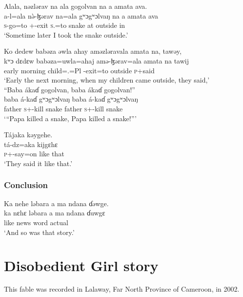 \ea  Alala,  nəzlərav  na ala  gogolvan  na   a  amata  ava. \\
\gll a-l=ala    n\`ə-ɮərav         na=ala  gʷɔgʷɔlvaŋ  na  a  amata  ava\\
\textsc{s}-go=to  {\oneS}+{\PFV}-exit  \textsc{s}.{\DO}=to  snake        {\PSP}    at   outside  in\\
\glt ‘Sometime later I took the snake outside.’ 
\z

\ea Ko  dedew  babəza  əwla  ahay  aməzləravala  amata  na, tawəy,\\
\gll kʷɔ     dɛdɛw     babəza=uwla=ahaj  amə-ɮərav=ala  amata      na    tawij\\
early   morning  child={\oneS}.{\POSS}=Pl  {\NOM}{}-exit=to     outside   {\PSP}    \textsc{p}+said\\
\glt ‘Early the next morning, when my children came outside, they said,’\\

\largerpage[2]
\medskip
 “Baba  ákaɗ  gogolvan,  baba   ákaɗ  gogolvan!”\\
\gll baba     á-kaɗ gʷɔgʷɔlvaŋ  baba   á-kaɗ gʷɔgʷɔlvaŋ\\
father   \textsc{s}+{\IFV}-kill      snake    father   \textsc{s}+{\IFV}-kill      snake\\
\glt  ‘“Papa killed a snake, Papa killed a snake!”’
\z

\ea Tájaka  kəygehe.\\
\gll tá-dz=aka   kijgɛhɛ\\
\textsc{p}+{\IFV}-say=on  {like that}\\
\glt ‘They said it like that.’
\z

\subsubsection*{Conclusion}
\ea Ka  nehe  ləbara  a  ma  ndana  ɗəwge.\\
\gll ka  nɛhɛ  ləbara  a       ma      ndana  ɗuwgɛ\\
like  {\DEM}  news    {\GEN}  word  {\DEM}      actual\\
\glt ‘And so was that story.’
\z

\section[Disobedient Girl story]{Disobedient Girl story}\setcounter{equation}{0}
\hypertarget{RefHeading1210341525720847}{}\label{sec:1.5}
This fable was recorded in Lalaway, Far North Province of Cameroon, in 2002. 

